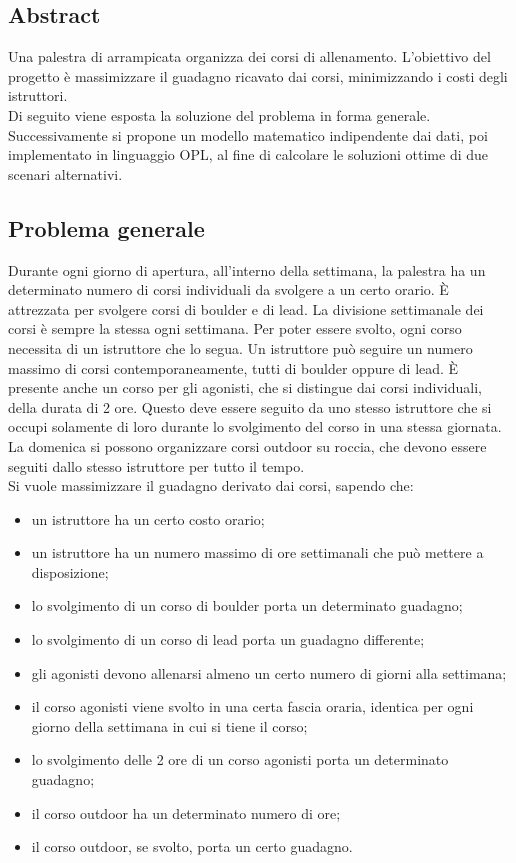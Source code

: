 \subsection{Abstract}
Una palestra di arrampicata organizza dei corsi di allenamento. L'obiettivo del progetto è massimizzare il guadagno ricavato dai corsi, minimizzando i costi degli istruttori. \\
Di seguito viene esposta la soluzione del problema in forma generale. Successivamente si propone un modello matematico indipendente dai dati, poi implementato in linguaggio OPL, al fine di calcolare le soluzioni ottime di due scenari alternativi.

\subsection{Problema generale}
Durante ogni giorno di apertura, all'interno della settimana, la palestra ha un determinato numero di corsi individuali da svolgere a un certo orario. È attrezzata per svolgere corsi di boulder e di lead. La divisione settimanale dei corsi è sempre la stessa ogni settimana. Per poter essere svolto, ogni corso necessita di un istruttore che lo segua. Un istruttore può seguire un numero massimo di corsi contemporaneamente, tutti di boulder oppure di lead. È presente anche un corso per gli agonisti, che si distingue dai corsi individuali, della durata di 2 ore. Questo deve essere seguito da uno stesso istruttore che si occupi solamente di loro durante lo svolgimento del corso in una stessa giornata. La domenica si possono organizzare corsi outdoor su roccia, che devono essere seguiti dallo stesso istruttore per tutto il tempo. \\
Si vuole massimizzare il guadagno derivato dai corsi, sapendo che:
\begin{itemize}
	\item un istruttore ha un certo costo orario;
	\item un istruttore ha un numero massimo di ore settimanali che può mettere a disposizione;
	\item lo svolgimento di un corso di boulder porta un determinato guadagno;
	\item lo svolgimento di un corso di lead porta un guadagno differente;
	\item gli agonisti devono allenarsi almeno un certo numero di giorni alla settimana;
	\item il corso agonisti viene svolto in una certa fascia oraria, identica per ogni giorno della settimana in cui si tiene il corso;
	\item lo svolgimento delle 2 ore di un corso agonisti porta un determinato guadagno;
	\item il corso outdoor ha un determinato numero di ore;
	\item il corso outdoor, se svolto, porta un certo guadagno.
\end{itemize}
